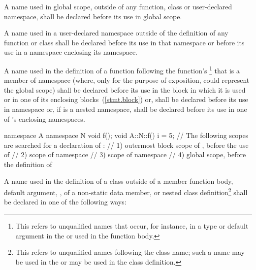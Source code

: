 \pnum
A name used in global scope, outside of any function, class or
user-declared namespace, shall be declared before its use in global
scope.

\pnum
A name used in a user-declared namespace outside of the definition of
any function or class shall be declared before its use in that namespace
or before its use in a namespace enclosing its namespace.

\pnum
A name used in the definition of a function following the function's
\footnote{This refers to unqualified names
that occur, for instance, in
a type or default argument in the
 or used in the function body.}
that is a member of namespace  (where, only for the purpose of
exposition,  could represent the global scope) shall be
declared before its use in the block in which it is used or in one of
its enclosing blocks~(\ref{stmt.block}) or, shall be declared before its
use in namespace  or, if  is a nested namespace, shall
be declared before its use in one of 's enclosing namespaces.
\enterexample

\begin{codeblock}
namespace A {
  namespace N {
    void f();
  }
}
void A::N::f() {
  i = 5;
  // The following scopes are searched for a declaration of :
  // 1) outermost block scope of , before the use of 
  // 2) scope of namespace 
  // 3) scope of namespace 
  // 4) global scope, before the definition of 
}
\end{codeblock}
\exitexample 

\pnum
A name used in the definition of a class  outside of a member
function body, default argument, ,
 of a non-static data member,
or nested class definition\footnote{This refers to unqualified names
following the class name; such a name may be used in the
 or may be used in the class definition.}
shall be declared in one of the following ways:

